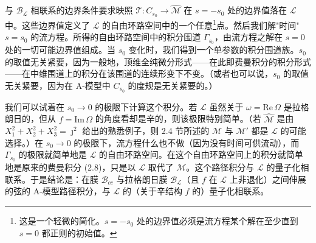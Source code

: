 \documentclass[11pt,a4paper,UTF8]{ctexart}
\theoremstyle{plain}
\theoremstyle{definition}
\begin{document}

与 $\mathcal{B}_{\mathcal{L}}$ 相联系的边界条件要求映照 $\mathcal{T}:C_{s_0}\to\widehat{\mathcal{M}}$ 在 $s=-s_0$ 处的边界值落在 $\mathcal{L}$ 中。这些边界值定义了 $\mathcal{L}$ 的自由环路空间中的一个任意\footnote{这是一个轻微的简化。$s=-s_0$ 处的边界值必须是流方程某个解在至少直到 $s=0$ 都正则的初始值。}点。然后我们解"时间" $s=s_0$ 的流方程。所得的自由环路空间中的积分围道 $\Gamma_{s_0}$，由流方程之解在 $s=0$ 处的一切可能边界值组成。当 $s_0$ 变化时，我们得到一个单参数的积分围道族。$s_0$ 的取值无关紧要，因为一般地，顶维全纯微分形式——在此即费曼积分的积分形式——在中维围道上的积分在该围道的连续形变下不变。（或者也可以说，$s_0$ 的取值无关紧要，因为在 A-模型中 $C_{s_0}$ 的度规是无关紧要的。）


我们可以试着在 $s_0\to0$ 的极限下计算这个积分。若 $\mathcal{L}$ 虽然关于 $\omega=\mathrm{Re}\,\Omega$ 是拉格朗日的，但从 $f=\mathrm{Im}\,\Omega$ 的角度看却是辛的，则该极限特别简单。（若 $\widehat{\mathcal{M}}$ 是由 $X_1^2+X_2^2+X_3^2=\jmath^2$ 给出的熟悉例子，则 2.4 节所述的 $\mathcal{M}$ 与 $\mathcal{M}'$ 都是 $\mathcal{L}$ 的可能选择。）在 $s_0\to0$ 的极限下，流方程什么也不做（因为没有时间可供流动），而 $\Gamma_{s_0}$ 的极限就简单地是 $\mathcal{L}$ 的自由环路空间。在这个自由环路空间上的积分就简单地是原来的费曼积分 (2.8)，只是以 $\mathcal{L}$ 取代了 $\mathcal{M}$。这个路径积分与 $\mathcal{L}$ 的量子化相联系。于是结论是：在膜 $\mathcal{B}_{cc}$ 与拉格朗日膜 $\mathcal{B}_{\mathcal{L}}$（且 $f$ 在 $\mathcal{L}$ 上非退化）之间伸展的弦的 A-模型路径积分，与 $\mathcal{L}$ 的（关于辛结构 $f$ 的）量子化相联系。

\end{document}
